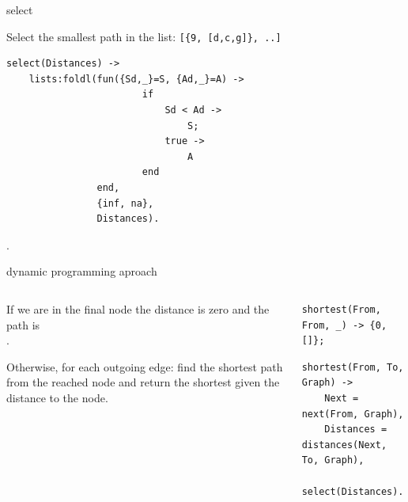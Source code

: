 \begin{frame}[fragile]{select}

Select the smallest path in the list: \texttt{[\{9, [d,c,g]\}, ..]}

\vspace{10pt}\pause

\begin{verbatim}
select(Distances) ->
    lists:foldl(fun({Sd,_}=S, {Ad,_}=A) ->
                        if 
                            Sd < Ad ->
                                S;
                            true ->
                                A
                        end
                end,
                {inf, na},
                Distances).
\end{verbatim}

\pause{}.
\end{frame}

\begin{frame}[fragile]{dynamic programming aproach}

\begin{columns}
 \begin{column}{0.4\linewidth}
  If we are in the final node the distance is zero and the path is \[\].

  \vspace{10pt}
  Otherwise, for each outgoing edge: find the shortest path from the
  reached node and return the shortest given the distance to the node.

 \end{column}
 \begin{column}{0.6\linewidth}
  \begin{verbatim}
shortest(From, From, _) -> {0, []};
  \end{verbatim}
  \pause
  \begin{verbatim}
shortest(From, To, Graph) ->
    Next = next(From, Graph),
    Distances = distances(Next, To, Graph),
    select(Distances).
  \end{verbatim}
 \end{column}
\end{columns}

\pause\vspace{20pt}{\em What is the complexity?}

\end{frame}



